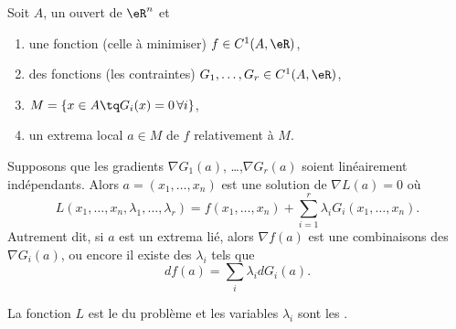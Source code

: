 \begin{theorem} \label{ThoRGJosS}
    Soit \( A\), un ouvert de \( \eR^n\) et
    \begin{enumerate}
        \item
            une fonction (celle à minimiser) $f\in C^1(A,\eR)$,
        \item 
            des fonctions (les contraintes) $G_1,\ldots,G_r\in C^1(A,\eR)$,
        \item
            $M=\{ x\in A\tq G_i(x)=0\,\forall i\}$,
        \item
            un extrema local $a\in M$ de $f$ relativement à $M$.
    \end{enumerate}
    Supposons que les gradients $\nabla G_1(a)$, \ldots,$\nabla G_r(a)$ soient linéairement indépendants. Alors $a=(x_1,\ldots,x_n)$ est une solution de \( \nabla L(a)=0\) où
    \begin{equation}
        L(x_1,\ldots,x_n,\lambda_1,\ldots,\lambda_r)=f(x_1,\ldots,x_n)+\sum_{i=1}^r\lambda_iG_i(x_1,\ldots,x_n).
    \end{equation}
    Autrement dit, si \( a\) est un extrema lié, alors \( \nabla f(a)\) est une combinaisons des \( \nabla G_i(a)\), ou encore il existe des \( \lambda_i\) tels que
    \begin{equation}    \label{EqRDsSXyZ}
        df(a)=\sum_i\lambda_idG_i(a).
    \end{equation}
\end{theorem}
La fonction $L$ est le  du problème et les variables \( \lambda_i\) sont les .

